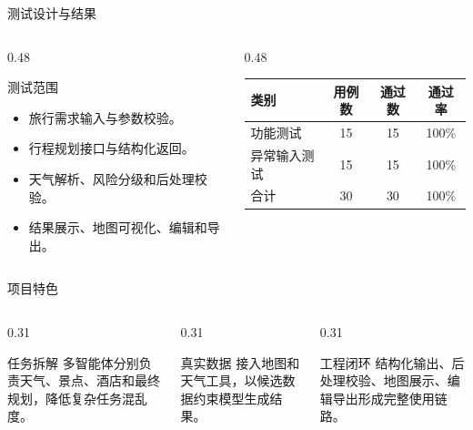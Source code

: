 \documentclass[aspectratio=169]{beamer}
\begin{document}
\begin{frame}{测试设计与结果}
  \begin{columns}[T,onlytextwidth]
    \begin{column}{0.48\linewidth}
      \begin{block}{测试范围}
        \begin{itemize}
          \item 旅行需求输入与参数校验。
          \item 行程规划接口与结构化返回。
          \item 天气解析、风险分级和后处理校验。
          \item 结果展示、地图可视化、编辑和导出。
        \end{itemize}
      \end{block}
    \end{column}
    \begin{column}{0.48\linewidth}
      \begin{table}
        \small
        \centering
        \begin{tabular}{@{}lccc@{}}
          \toprule
          类别 & 用例数 & 通过数 & 通过率 \\
          \midrule
          功能测试 & 15 & 15 & 100\% \\
          异常输入测试 & 15 & 15 & 100\% \\
          \midrule
          合计 & 30 & 30 & 100\% \\
          \bottomrule
        \end{tabular}
      \end{table}
    \end{column}
  \end{columns}
\end{frame}

\begin{frame}{项目特色}
  \begin{columns}[T]
    \begin{column}{0.31\linewidth}
      \begin{block}{任务拆解}
        多智能体分别负责天气、景点、酒店和最终规划，降低复杂任务混乱度。
      \end{block}
    \end{column}
    \begin{column}{0.31\linewidth}
      \begin{block}{真实数据}
        接入地图和天气工具，以候选数据约束模型生成结果。
      \end{block}
    \end{column}
    \begin{column}{0.31\linewidth}
      \begin{block}{工程闭环}
        结构化输出、后处理校验、地图展示、编辑导出形成完整使用链路。
      \end{block}
    \end{column}
  \end{columns}
\end{frame}
\end{document}
